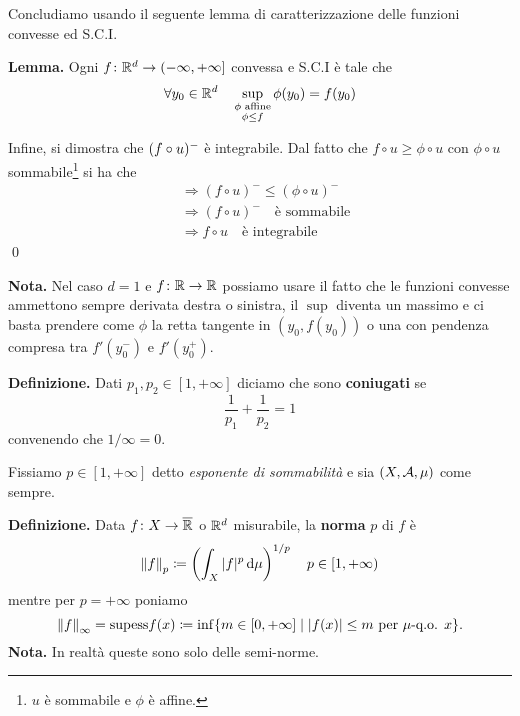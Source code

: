 Concludiamo usando il seguente lemma di caratterizzazione delle funzioni convesse ed S.C.I.

\textbf{Lemma.}
Ogni $f \colon \mathbb R^d \to (-\infty, +\infty]$ convessa e S.C.I è tale che
$$
\forall y_0 \in \mathbb R^d \quad \sup_{\substack{\phi \text{ affine} \\ \phi \leq f}} \phi(y_0) = f(y_0)
$$

Infine, si dimostra che $(f \circ u)^-$ è integrabile. 
Dal fatto che $f \circ u \geq \phi \circ u$ con $\phi \circ u$ sommabile\footnote{$u$ è sommabile e $\phi$ è affine.} si ha che
\begin{align*}
	& \Longrightarrow \left( f \circ u \right)^- \leq \left( \phi \circ u \right)^- \\
	& \Longrightarrow \left( f \circ u \right)^- \quad \text{è sommabile} \\
	& \Longrightarrow f \circ u \quad \text{è integrabile}
\end{align*}
\qed

\textbf{Nota.} Nel caso $d = 1$ e $f \colon \mathbb R \to \mathbb R$ possiamo usare il fatto che le funzioni convesse ammettono sempre derivata destra o sinistra, il $\sup$ diventa un massimo e ci basta prendere come $\phi$ la retta tangente in $(y_0, f(y_0))$ o una con pendenza compresa tra $f'(y_0^-)$ e $f'(y_0^+)$.

\textbf{Definizione.} Dati $p_1, p_2 \in [1, +\infty]$ diciamo che sono \textbf{coniugati} se
$$
\frac{1}{p_1} + \frac{1}{p_2} = 1
$$
convenendo che $1/\infty = 0$.

Fissiamo $p \in [1, +\infty]$ detto \textit{esponente di sommabilità} e sia $(X, \mathcal{A}, \mu)$ come sempre.

\textbf{Definizione.} Data $f \colon X \to \overline {\mathbb R}$ o $\mathbb R^d$ misurabile, la \textbf{norma} $p$ di $f$ è
$$
	\left\lVert f \right\rVert_p \coloneqq \left( \int_X |f|^p \,\mathrm{d} \mu \right)^{1/p} \quad p \in [1, +\infty)
$$
mentre per $p = +\infty$ poniamo
$$
	\left\lVert f \right\rVert_\infty = \mathrm{supess} f(x) \coloneqq \inf \{ m \in [0, +\infty] \mid |f(x)| \leq m \text{ per $\mu$-q.o. } x \}.
$$
\textbf{Nota.} In realtà queste sono solo delle semi-norme.

